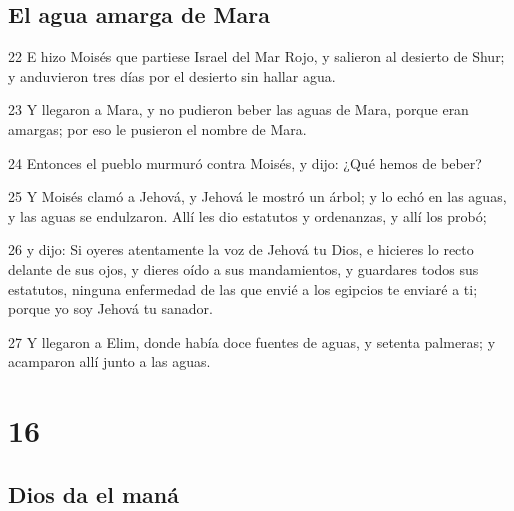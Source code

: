 \section*{El agua amarga de Mara}

\par 22 E hizo Moisés que partiese Israel del Mar Rojo, y salieron al desierto de Shur; y anduvieron tres días por el desierto sin hallar agua.
\par 23 Y llegaron a Mara, y no pudieron beber las aguas de Mara, porque eran amargas; por eso le pusieron el nombre de Mara.
\par 24 Entonces el pueblo murmuró contra Moisés, y dijo: ¿Qué hemos de beber?
\par 25 Y Moisés clamó a Jehová, y Jehová le mostró un árbol; y lo echó en las aguas, y las aguas se endulzaron. Allí les dio estatutos y ordenanzas, y allí los probó;
\par 26 y dijo: Si oyeres atentamente la voz de Jehová tu Dios, e hicieres lo recto delante de sus ojos, y dieres oído a sus mandamientos, y guardares todos sus estatutos, ninguna enfermedad de las que envié a los egipcios te enviaré a ti; porque yo soy Jehová tu sanador.
\par 27 Y llegaron a Elim, donde había doce fuentes de aguas, y setenta palmeras; y acamparon allí junto a las aguas.

\chapter{16}

\section*{Dios da el maná}


